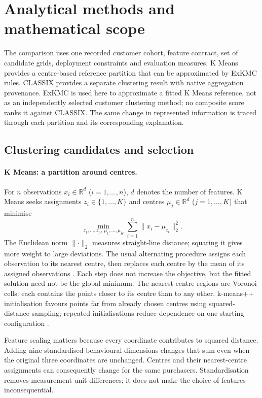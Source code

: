 \section{Analytical methods and mathematical scope}

The comparison uses one recorded customer cohort, feature contract, set of candidate grids, deployment constraints and evaluation measures. K Means provides a centre-based reference partition that can be approximated by ExKMC rules. CLASSIX provides a separate clustering result with native aggregation provenance. ExKMC is used here to approximate a fitted K Means reference, not as an independently selected customer clustering method; no composite score ranks it against CLASSIX. The same change in represented information is traced through each partition and its corresponding explanation.

\subsection{Clustering candidates and selection}

\paragraph{K Means: a partition around centres.}
For $n$ observations $x_i\in\mathbb{R}^d$ ($i=1,\ldots,n$), $d$ denotes the number of features. K Means seeks assignments $z_i\in\{1,\ldots,K\}$ and centres $\mu_j\in\mathbb{R}^d$ ($j=1,\ldots,K$) that minimise
\[
 \min_{z_1,\ldots,z_n,\,\mu_1,\ldots,\mu_K}
 \sum_{i=1}^{n}\lVert x_i-\mu_{z_i}\rVert_2^2.
\]
The Euclidean norm $\lVert\cdot\rVert_2$ measures straight-line distance; squaring it gives more weight to large deviations. The usual alternating procedure assigns each observation to its nearest centre, then replaces each centre by the mean of its assigned observations \citep{macqueen1967kmeans,sklearn172}. Each step does not increase the objective, but the fitted solution need not be the global minimum. The nearest-centre regions are Voronoi cells: each contains the points closer to its centre than to any other. k-means++ initialisation favours points far from already chosen centres using squared-distance sampling; repeated initialisations reduce dependence on one starting configuration \citep{arthur2007kmeanspp}.

Feature scaling matters because every coordinate contributes to squared distance. Adding nine standardised behavioural dimensions changes that sum even when the original three coordinates are unchanged. Centres and their nearest-centre assignments can consequently change for the same purchasers. Standardisation removes measurement-unit differences; it does not make the choice of features inconsequential.

